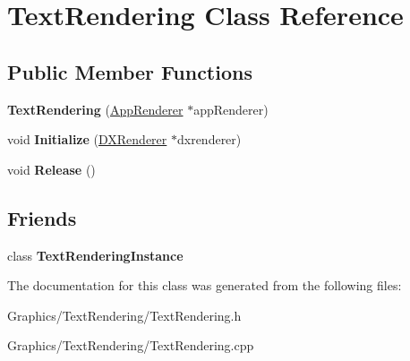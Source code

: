 \hypertarget{classTextRendering}{}\section{Text\+Rendering Class Reference}
\label{classTextRendering}
\subsection*{Public Member Functions}
\begin{DoxyCompactItemize}
\item 
\mbox{\label{classTextRendering_adf27a63c759de943a552376b1fdc23bc}} 
{\bfseries Text\+Rendering} (\hyperlink{classAppRenderer}{App\+Renderer} $\ast$app\+Renderer)
\item 
\mbox{\label{classTextRendering_a5ab3ad088a3897dad94f55a8ed4a6dd4}} 
void {\bfseries Initialize} (\hyperlink{classDXRenderer}{D\+X\+Renderer} $\ast$dxrenderer)
\item 
\mbox{\label{classTextRendering_a3fb8cb9b77317a251e6b281796d4fff4}} 
void {\bfseries Release} ()
\end{DoxyCompactItemize}
\subsection*{Friends}
\begin{DoxyCompactItemize}
\item 
\mbox{\label{classTextRendering_a5532c3b535b4f2a814054dba701936df}} 
class {\bfseries Text\+Rendering\+Instance}
\end{DoxyCompactItemize}


The documentation for this class was generated from the following files\+:\begin{DoxyCompactItemize}
\item 
Graphics/\+Text\+Rendering/Text\+Rendering.\+h\item 
Graphics/\+Text\+Rendering/Text\+Rendering.\+cpp\end{DoxyCompactItemize}
